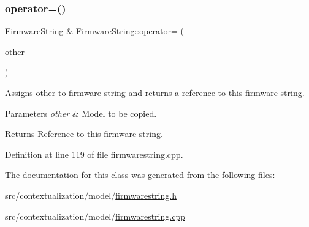 \mbox{\label{classFirmwareString_aa2fe115e019e6362ca1fb151097ffe88}} 
\subsubsection{\texorpdfstring{operator=()}{operator=()}}
{\footnotesize\ttfamily \mbox{\hyperlink{classFirmwareString}{Firmware\+String}} \& Firmware\+String\+::operator= (\begin{DoxyParamCaption}\item[{const \mbox{\hyperlink{classFirmwareString}{Firmware\+String}} \&}]{other }\end{DoxyParamCaption})}



Assigns other to firmware string and returns a reference to this firmware string. 


\begin{DoxyParams}{Parameters}
{\em other} & Model to be copied. \\
\hline
\end{DoxyParams}
\begin{DoxyReturn}{Returns}
Reference to this firmware string. 
\end{DoxyReturn}


Definition at line 119 of file firmwarestring.\+cpp.



The documentation for this class was generated from the following files\+:\begin{DoxyCompactItemize}
\item 
src/contextualization/model/\mbox{\hyperlink{firmwarestring_8h}{firmwarestring.\+h}}\item 
src/contextualization/model/\mbox{\hyperlink{firmwarestring_8cpp}{firmwarestring.\+cpp}}\end{DoxyCompactItemize}
